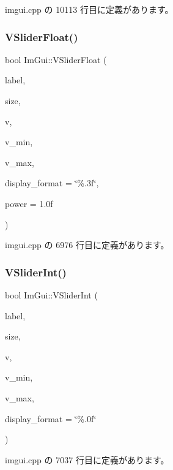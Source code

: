  imgui.\+cpp の 10113 行目に定義があります。

\mbox{\label{namespace_im_gui_ae629791ee70ba60199597cd1866b3735}} 
\subsubsection{\texorpdfstring{V\+Slider\+Float()}{VSliderFloat()}}
{\footnotesize\ttfamily bool Im\+Gui\+::\+V\+Slider\+Float (\begin{DoxyParamCaption}\item[{const char $\ast$}]{label,  }\item[{const \mbox{\hyperlink{struct_im_vec2}{Im\+Vec2}} \&}]{size,  }\item[{float $\ast$}]{v,  }\item[{float}]{v\+\_\+min,  }\item[{float}]{v\+\_\+max,  }\item[{const char $\ast$}]{display\+\_\+format = {\ttfamily \char`\"{}\%.3f\char`\"{}},  }\item[{float}]{power = {\ttfamily 1.0f} }\end{DoxyParamCaption})}



 imgui.\+cpp の 6976 行目に定義があります。

\mbox{\label{namespace_im_gui_a7a8e53471ef7f8b7ad28abea35a40bf4}} 
\subsubsection{\texorpdfstring{V\+Slider\+Int()}{VSliderInt()}}
{\footnotesize\ttfamily bool Im\+Gui\+::\+V\+Slider\+Int (\begin{DoxyParamCaption}\item[{const char $\ast$}]{label,  }\item[{const \mbox{\hyperlink{struct_im_vec2}{Im\+Vec2}} \&}]{size,  }\item[{int $\ast$}]{v,  }\item[{int}]{v\+\_\+min,  }\item[{int}]{v\+\_\+max,  }\item[{const char $\ast$}]{display\+\_\+format = {\ttfamily \char`\"{}\%.0f\char`\"{}} }\end{DoxyParamCaption})}



 imgui.\+cpp の 7037 行目に定義があります。

